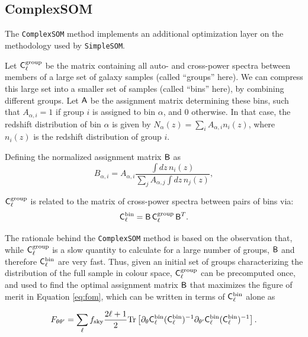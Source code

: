 \documentclass[twocolumn,twocolappendix]{aastex63}
\begin{document}
\subsection{ {\sc ComplexSOM} }
The {\tt ComplexSOM} method implements an additional optimization layer on the
methodology used by {\tt SimpleSOM}.

Let ${\sf C}^{\rm group}_\ell$ be the matrix containing all auto- and
cross-power spectra between members of a large set of galaxy samples (called
``groups'' here). We can compress this large set into a smaller set of samples
(called ``bins'' here), by combining different groups. Let ${\sf A}$ be the
assignment matrix determining these bins, such that $A_{\alpha,i}=1$ if group
$i$ is assigned to bin $\alpha$, and 0 otherwise. In that case, the redshift
distribution of bin $\alpha$ is given by $N_\alpha(z)=\sum_i
A_{\alpha,i}n_i(z)$, where $n_i(z)$ is the redshift distribution of group $i$.

Defining the normalized assignment matrix ${\sf B}$ as
\begin{equation}
B_{\alpha,i}=A_{\alpha,i}\frac{\int dz\,n_i(z)}{\sum_j A_{\alpha,j}\int dz\,n_j(z)},
\end{equation}

${\sf C}^{\rm group}_\ell$ is related to the matrix of cross-power spectra
between pairs of bins via:
\begin{equation}
{\sf C}^{\rm bin}_\ell={\sf B}\,{\sf C}^{\rm group}_\ell\,{\sf B}^T.
\end{equation}

The rationale behind the {\tt ComplexSOM} method is based on the observation
that, while ${\sf C}^{\rm group}_\ell$ is a slow quantity to calculate for a
large number of groups, ${\sf B}$ and therefore ${\sf C}^{\rm bin}_\ell$ are
very fast. Thus, given an initial set of groups characterizing the
distribution of the full sample in colour space, ${\sf C}^{\rm group}_\ell$
can be precomputed once, and used to find the optimal assignment matrix ${\sf
B}$ that maximizes the figure of merit in Equation \ref{eq:fom},
which can be written in terms of ${\sf C}^{\rm bin}_\ell$ alone as

\begin{equation}\label{eq:fom_tr}
F_{\theta\theta'}=\sum_\ell f_{\rm sky}\frac{2\ell+1}{2}{\rm Tr}\left[\partial_\theta{\sf C}^{\rm bin}_\ell({\sf C}^{\rm bin}_\ell)^{-1}\partial_{\theta'}{\sf C}^{\rm bin}_\ell({\sf C}_\ell^{\rm bin})^{-1}\right].
\end{equation}
\end{document}
